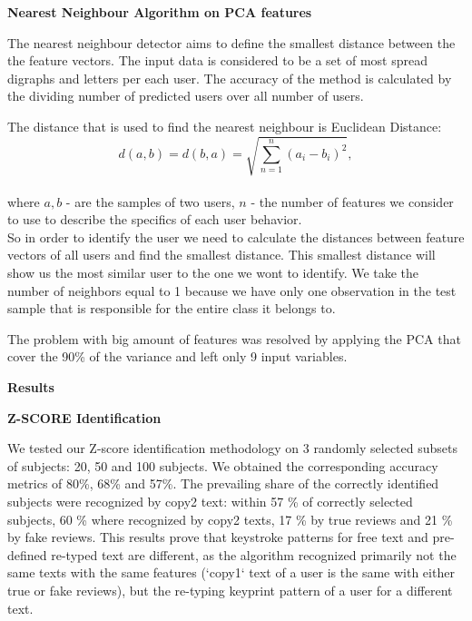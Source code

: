 \documentclass[12pt,a4]{article}
\begin{document}
\bigskip
\small\textbf{Nearest Neighbour Algorithm on PCA features}
\bigskip

\normalsize 

The nearest neighbour detector aims to define the smallest distance between the the feature vectors. The input data is considered to be a set of most spread digraphs and letters per each user.  The accuracy of the method is calculated by the dividing number of predicted users over all number of users. 

The distance that is used to find the nearest neighbour is Euclidean Distance:\\


$$
d(a,b) = d(b,a) = \sqrt{\sum_{n=1}^{n} (a_i - b_i)^2},
$$\\

where $a, b$ - are the samples of two users, $n$ - the number of features we consider to use to describe the specifics of each  user behavior.\\

So in order to identify the user we need to calculate the distances between feature vectors of all users and find the smallest distance. This smallest distance will show us the most similar user to the one we wont to identify. We take the number of neighbors equal to 1 because we have only one observation in the test sample that is responsible for the entire class it belongs to.

The problem with big amount of features was resolved by applying the PCA that cover the 90\% of the variance and left only 9 input variables.


\newpage
\bigskip
\large\textbf{Results}
\bigskip

\medskip
\small\textbf{Z-SCORE Identification}
\medskip

\normalsize

We tested our Z-score identification methodology on 3 randomly selected subsets of subjects: 20, 50 and 100 subjects. We obtained the corresponding accuracy metrics of 80\%, 68\% and 57\%. The prevailing share of the correctly identified subjects were recognized by copy2 text: within 57 \% of correctly selected subjects, 60 \% where recognized by copy2 texts, 17 \% by true reviews and 21 \% by fake reviews. This results prove that keystroke patterns for free text and pre-defined re-typed text are different, as the algorithm recognized primarily not the same texts with the same features (`copy1` text of a user is the same with either true or fake reviews), but the re-typing keyprint pattern of a user for a different text.
\end{document}
